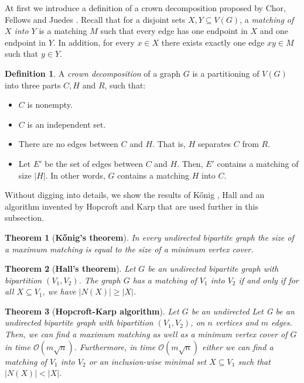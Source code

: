 \documentclass[en]{pracamgr}
\newtheorem{theorem}{Theorem}
\theoremstyle{definition}
\newtheorem{definition}{Definition}
\begin{document}
At first we introduce a definition of a crown decomposition proposed by Chor, Fellows and Juedes \cite{Crown}. Recall that for a disjoint sets $X,Y \subseteq V(G)$, a \textit{matching of $X$ into $Y$} is a matching $M$ such that every edge has one endpoint in $X$ and one endpoint in $Y$. In addition, for every $x \in X$ there exists exactly one edge $xy \in M$ such that $y \in Y$.

\begin{definition}
	A \textit{crown decomposition} of a graph $G$ is a partitioning of $V(G)$ into three parts $C,H$ and $R$, such that:
	\begin{itemize}
		\item $C$ is nonempty.
		\item $C$ is an independent set.
		\item There are no edges between $C$ and $H$. That is, $H$ separates $C$ from $R$.
		\item Let $E'$ be the set of edges between $C$ and $H$. Then, $E'$ contains a matching of size $|H|$. In other words, $G$ contains a matching $H$ into $C$.
	\end{itemize}
\end{definition}

Without digging into details, we show the results of Kőnig \cite{Konig}, Hall \cite{Hall} and an algorithm invented by Hopcroft and Karp \cite{Hopcroft-Karp} that are used further in this subsection.

\begin{theorem}[\textbf{Kőnig's theorem}]
	In every undirected bipartite graph the size of a maximum matching is equal to the size of a minimum vertex cover.
\end{theorem}

\begin{theorem}[\textbf{Hall's theorem}]
	Let $G$ be an undirected bipartite graph with bipartition $(V_1,V_2)$. The graph $G$ has a matching of $V_1$ into $V_2$ if and only if for all $X \subseteq V_1$, we have $|N(X)| \geq |X|$.
\end{theorem}

\begin{theorem}[\textbf{Hopcroft-Karp algorithm}]
	Let $G$ be an undirected Let G be an undirected bipartite graph with bipartition $(V_1,V_2)$, on $n$ vertices and $m$ edges.	Then, we can find a maximum matching as well as a minimum vertex cover of $G$ in time $\mathcal{O}(m\sqrt{n})$. Furthermore, in time $\mathcal{O}(m\sqrt{n})$ either we can find a matching of $V_1$ into $V_2$ or an inclusion-wise minimal set $X \subseteq V_1$ such that $|N(X)| < |X|$.
\end{theorem}
\end{document}
